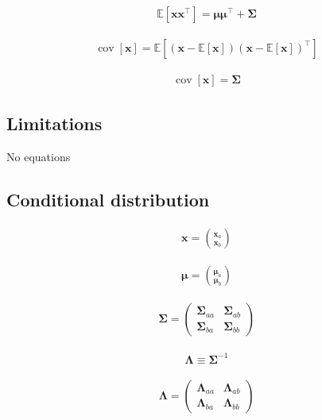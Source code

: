 \documentclass{article}
\begin{document}
\begin{align*}
\mathbb{E}\left[\mathbf{x} \mathbf{x}^{\top}\right] = \boldsymbol{\mu} \boldsymbol{\mu}^{\top} + \boldsymbol{\Sigma}
\tag{3.46}
\end{align*}

\begin{align*}
\operatorname{cov}[\mathbf{x}] = \mathbb{E}\left[ (\mathbf{x} - \mathbb{E}[\mathbf{x}]) (\mathbf{x} - \mathbb{E}[\mathbf{x}])^{\top} \right]
\tag{3.47}
\end{align*}

\begin{align*}
\operatorname{cov}[\mathbf{x}] = \boldsymbol{\Sigma}
\tag{3.48}
\end{align*}

\subsection{Limitations}

No equations

\subsection{Conditional distribution}

\begin{align*}
\mathbf{x} = \binom{\mathbf{x}_{a}}{\mathbf{x}_{b}} 
\tag{3.49}
\end{align*}

\begin{align*}
\boldsymbol{\mu} = \binom{\boldsymbol{\mu}_{a}}{\boldsymbol{\mu}_{b}} 
\tag{3.50}
\end{align*}

\begin{align*}
\boldsymbol{\Sigma} = \left(\begin{array}{ll}
\boldsymbol{\Sigma}_{a a} & \boldsymbol{\Sigma}_{a b} \\
\boldsymbol{\Sigma}_{b a} & \boldsymbol{\Sigma}_{b b}
\end{array}\right)
\tag{3.51}
\end{align*}

\begin{align*}
\mathbf{\Lambda} \equiv \boldsymbol{\Sigma}^{-1} 
\tag{3.52}
\end{align*}

\begin{align*}
\boldsymbol{\Lambda} = \left(\begin{array}{ll}
\boldsymbol{\Lambda}_{a a} & \boldsymbol{\Lambda}_{a b} \\
\boldsymbol{\Lambda}_{b a} & \boldsymbol{\Lambda}_{b b}
\end{array}\right)
\tag{3.53}
\end{align*}
\end{document}
